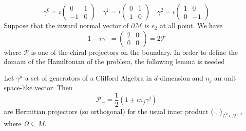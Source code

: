\begin{equation*}
\gamma^0 = i\begin{pmatrix} 0 & 1 \\ -1 & 0 \end{pmatrix}  \quad
\gamma^1 = i\begin{pmatrix} 0 & 1 \\ 1 & 0 \end{pmatrix}  \quad
\gamma^2 = i\begin{pmatrix} 1 & 0 \\ 0 & -1 \end{pmatrix}  
\end{equation*}
Suppose that the inward normal vector of $\partial \mathcal{M}$ is $e_2$ at all point.
We have
\begin{equation*}
1 - i\gamma^\bot = 
\begin{pmatrix} 2 & 0 \\ 0 & 0\end{pmatrix} = 2 \mathcal{P}
\end{equation*}
where $\mathcal{P}$ is one of the chiral projectors on the boundary. 
In order to define the domain of the Hamiltonian of the problem, the following lemma is needed 
\begin{lemma}\label{wen-proj}
Let $\gamma^\mu$ a set of generators of a Clifford Algebra in $d$-dimension and $n_j$ an unit space-like vector.
Then
\begin{equation*}
\mathcal{P}_\pm = \frac{1}{2}(1 \pm i n_j\gamma^j) 
\end{equation*}
are Hermitian projectors (so orthogonal) for the usual inner product $\langle \cdot, \cdot \rangle _{L^2(\Omega)}$, where $\Omega\subseteq M$.
\end{lemma}
